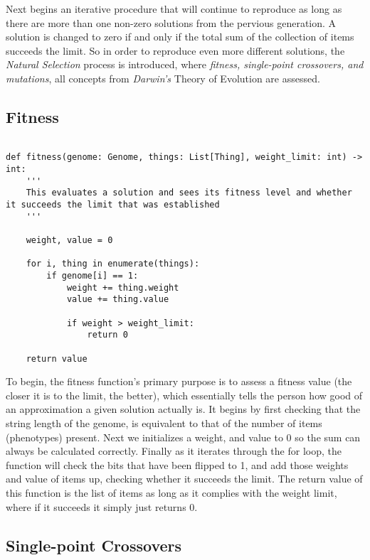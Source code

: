 Next begins an iterative procedure that will continue to reproduce as long as there are more than one non-zero solutions from the pervious generation. A solution is changed to zero if and only if the total sum of the collection of items succeeds the limit. So in order to reproduce even more different solutions, the \emph{Natural Selection} process is introduced, where \emph{fitness, single-point crossovers, and mutations}, all concepts from \emph{Darwin's} Theory of Evolution are assessed. 

\subsection{Fitness}

\begin{lstlisting}

def fitness(genome: Genome, things: List[Thing], weight_limit: int) -> int:
    '''
    This evaluates a solution and sees its fitness level and whether it succeeds the limit that was established
    '''

    weight, value = 0

    for i, thing in enumerate(things):
        if genome[i] == 1:
            weight += thing.weight
            value += thing.value

            if weight > weight_limit:
                return 0
    
    return value

\end{lstlisting}

To begin, the fitness function's primary purpose is to assess a fitness value (the closer it is to the limit, the better), which essentially tells the person how good of an approximation a given solution actually is. It begins by first checking that the string length of the genome, is equivalent to that of the number of items (phenotypes) present. Next we initializes a weight, and value to 0 so the sum can always be calculated correctly. Finally as it iterates through the for loop, the function  will check the bits that have been flipped to 1, and add those weights and value of items up, checking whether it succeeds the limit. The return value of this function is the list of items as long as it complies with the weight limit, where if it succeeds it simply just returns 0.   

\subsection{Single-point Crossovers} 

